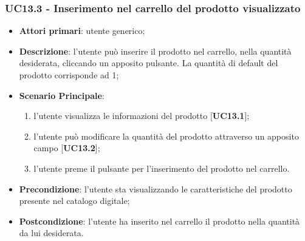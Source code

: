\subsubsection{UC13.3 - Inserimento nel carrello del prodotto visualizzato}
\begin{itemize}
\item \textbf{Attori primari}: utente generico;
\item \textbf{Descrizione}: l'utente può inserire il prodotto nel carrello, nella quantità desiderata, cliccando un apposito pulsante. La quantità di default del prodotto corrisponde ad 1;
\item \textbf{Scenario Principale}:
\begin{enumerate}
\item l'utente visualizza le informazioni del prodotto [\textbf{UC13.1}];
\item l'utente può modificare la quantità del prodotto attraverso un apposito campo [\textbf{UC13.2}];
\item l'utente preme il pulsante per l'inserimento del prodotto nel carrello.
\end{enumerate}
\item \textbf{Precondizione}: l'utente sta visualizzando le caratteristiche del prodotto presente nel catalogo digitale;
\item \textbf{Postcondizione}: l'utente ha inserito nel carrello il prodotto nella quantità da lui desiderata.
\end{itemize}